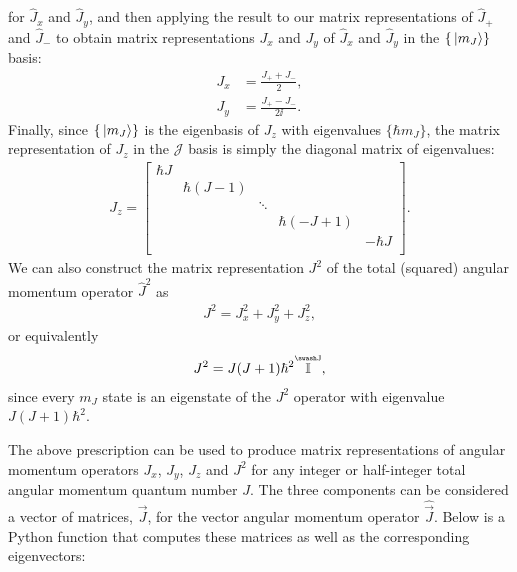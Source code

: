 for $\hat J_x$ and $\hat J_y$, and then applying the result to our matrix representations of $\hat J_+$ and $\hat J_-$ to obtain matrix representations $J_x$ and $J_y$ of $\hat J_x$ and $\hat J_y$ in the $\{\ket{m_J}\}$ basis:
\begin{align}
J_x &= \frac{J_+ + J_-}{2},\\
J_y &= \frac{J_+ - J_-}{2\ii}.
\end{align}
Finally, since $\{\ket{m_J}\}$ is the eigenbasis of $J_z$ with eigenvalues $\{\hbar m_J\}$, the matrix representation of $J_z$ in the $\mathcal{J}$ basis is simply the diagonal matrix of eigenvalues:
\begin{align}
J_z = \left[\begin{smallmatrix}
\hbar J\\
& \hbar (J - 1)\\
& & \ddots\\
& & & \hbar (- J + 1)\\
& & & & -\hbar J\\
\end{smallmatrix} \right].
\end{align} 
We can also construct the matrix representation $J^2$ of the total (squared) angular momentum operator $\hat J^2$ as
\begin{align}
J^2 = J_x^2 + J_y^2 + J_z^2, 
\end{align} 
or equivalently
\begin{align}
J^2 = J(J+1)\hbar^2 \oversetJ{\mathbb{I}},
\end{align}
since every $m_J$ state is an eigenstate of the $J^2$ operator with eigenvalue $J(J+1)\hbar^2$.

The above prescription can be used to produce matrix representations of angular momentum operators $J_x$, $J_y$, $J_z$ and $J^2$ for any integer or half-integer total angular momentum quantum number $J$. The three components can be considered a vector of matrices, $\vec J$, for the vector angular momentum operator $\hat {\vec J}$. Below is a Python function that computes these matrices as well as the corresponding eigenvectors:


